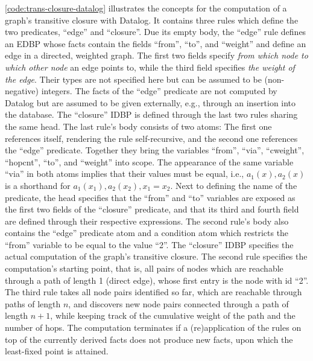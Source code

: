 \ref{code:trans-closure-datalog} illustrates the concepts for the
computation of a graph's transitive closure with Datalog.
It contains three rules which define the two predicates, ``edge'' and ``closure''.
Due its empty body, the ``edge'' rule defines an \ac{EDBP} whose facts
contain the fields ``from'', ``to'', and ``weight'' and define an edge
in a directed, weighted graph.
The first two fields specify \emph{from which node to which other node} an edge
points to, while the third field specifies \emph{the weight of the edge}.
Their types are not specified here but can be assumed to be (non-negative) integers.
The facts of the ``edge'' predicate are not computed by Datalog but
are assumed to be given externally, e.g., through an insertion into the database.
The ``closure'' \ac{IDBP} is defined through the last two rules sharing
the same head.
The last rule's body consists of two atoms: The first one references itself,
rendering the rule self-recursive, and the second one references the ``edge'' predicate.
Together they bring the variables ``from'', ``via'', ``cweight'', ``hopcnt'',
``to'', and ``weight'' into scope.
The appearance of the same variable ``via'' in both atoms implies that their
values must be equal, i.e.,
\(a_1(x), a_2(x)\) is a shorthand for \(a_1(x_1), a_2(x_2), x_1 = x_2\).
Next to defining the name of the predicate, the head specifies that the ``from''
and ``to'' variables are exposed as the first two fields of the ``closure'' predicate,
and that its third and fourth field are defined through their respective expressions.
The second rule's body also contains the ``edge'' predicate atom and a condition
atom which restricts the ``from'' variable to be equal to the value ``2''.
The ``closure'' \ac{IDBP} specifies the actual computation of the graph's
transitive closure.
The second rule specifies the computation's starting point,
that is, all pairs of nodes which are reachable through a path of length 1
(direct edge), whose first entry is the node with id ``2''.
The third rule takes all node pairs identified so far, which are reachable
through paths of length \(n\), and discovers new node pairs connected
through a path of length \(n + 1\),
while keeping track of the cumulative weight of the path and the number of hops.
The computation terminates if a (re)application of the rules on top of the
currently derived facts does not produce new facts,
upon which the least-fixed point is attained.

